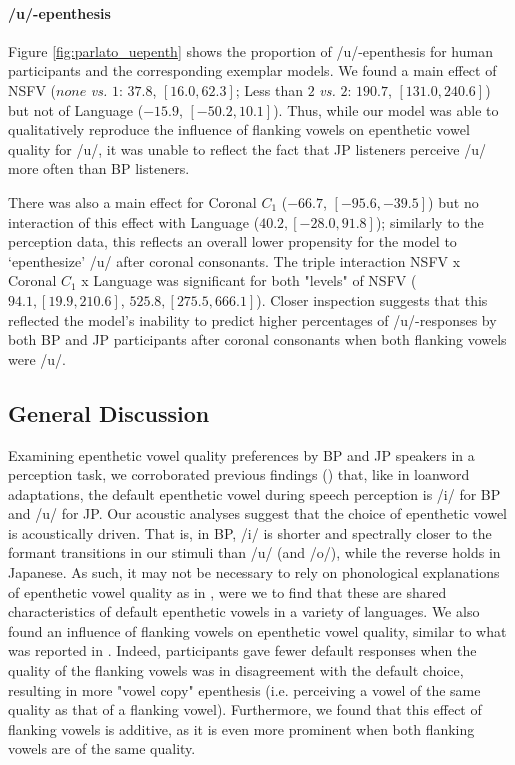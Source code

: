 \paragraph{/u/-epenthesis}

{\color{blue}Figure \ref{fig:parlato_uepenth} shows the proportion of /u/-epenthesis for human participants and the corresponding exemplar models.}
We found a main effect of NSFV ($none$ \textit{vs.} $1$: $37.8$, $[16.0, 62.3]$; Less than $2$ \textit{vs.} $2$: $190.7$, $[131.0, 240.6]$) but not of Language ($-15.9$, $[-50.2, 10.1]$). Thus, while our model was able to qualitatively reproduce the influence of flanking vowels on epenthetic vowel quality for /u/, it was unable to reflect the fact that JP listeners perceive /u/ more often than BP listeners. 

There was also a main effect for Coronal $C_{1}$ ($-66.7$, $[-95.6, -39.5]$) but no interaction of this effect with Language ($40.2, [-28.0, 91.8]$); similarly to the perception data, this reflects an overall lower propensity for the model to `epenthesize' /u/ after coronal consonants. 
The triple interaction NSFV x Coronal $C_{1}$ x Language was significant for both "levels" of NSFV ($94.1, [19.9, 210.6]$, $525.8, [275.5, 666.1]$). Closer inspection suggests that this reflected the model's inability to predict higher percentages of /u/-responses by both BP and JP participants after coronal consonants when both flanking vowels were /u/. 

\subsection{General Discussion}

Examining epenthetic vowel quality preferences by BP and JP speakers in a perception task, we corroborated previous findings (\cite{dupoux1999, dupoux2011}) that, like in loanword adaptations, the default epenthetic vowel during speech perception is /i/ for BP and /u/ for JP. Our acoustic analyses suggest that the choice of epenthetic vowel is acoustically driven. That is, in BP, /i/ is shorter and spectrally closer to the formant transitions in our stimuli than /u/ (and /o/), while the reverse holds in Japanese. As such, it may not be necessary to rely on phonological explanations of epenthetic vowel quality as in \cite{rose2006, uffmann2006}, were we to find that these are shared characteristics of default epenthetic vowels in a variety of languages. We also found an influence of flanking vowels on epenthetic vowel quality, similar to what was reported in \cite{dupoux2011}. Indeed, participants gave fewer default responses when the quality of the flanking vowels was in disagreement with the default choice, resulting in more "vowel copy" epenthesis (i.e. perceiving a vowel of the same quality as that of a flanking vowel). Furthermore, we found that this effect of flanking vowels is additive, as it is even more prominent when both flanking vowels are of the same quality. 

